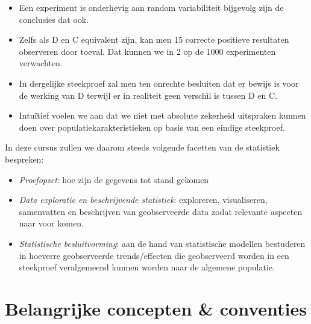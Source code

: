 \documentclass[12pt,dutch,coursenotes]{book}
\providecommand{\tightlist}{%
  \setlength{\itemsep}{0pt}\setlength{\parskip}{0pt}}
\theoremstyle{definition}
\theoremstyle{definition}
\theoremstyle{definition}
\theoremstyle{remark}
\begin{document}
\begin{itemize}
\tightlist
\item
  Een experiment is onderhevig aan random variabiliteit bijgevolg zijn
  de conclusies dat ook.
\item
  Zelfs als D en C equivalent zijn, kan men 15 correcte positieve
  resultaten observeren door toeval. Dat kunnen we in 2 op de 1000
  experimenten verwachten.
\item
  In dergelijke steekproef zal men ten onrechte besluiten dat er bewijs
  is voor de werking van D terwijl er in realiteit geen verschil is
  tussen D en C.\\
\item
  Intuïtief voelen we aan dat we niet met absolute zekerheid uitspraken
  kunnen doen over populatiekarakteristieken op basis van een eindige
  steekproef.
\end{itemize}

In deze cursus zullen we daarom steeds volgende facetten van de
statistiek bespreken:

\begin{itemize}
\tightlist
\item
  \emph{Proefopzet}: hoe zijn de gegevens tot stand gekomen
\item
  \emph{Data exploratie en beschrijvende statistiek}: exploreren,
  visualiseren, samenvatten en beschrijven van geobserveerde data zodat
  relevante aspecten naar voor komen.
\item
  \emph{Statistische besluitvorming}: aan de hand van statistische
  modellen bestuderen in hoeverre geobserveerde trends/effecten die
  geobserveerd worden in een steekproef veralgemeend kunnen worden naar
  de algemene populatie.
\end{itemize}

\chapter{Belangrijke concepten \&
conventies}\label{belangrijke-concepten-conventies}
\end{document}
